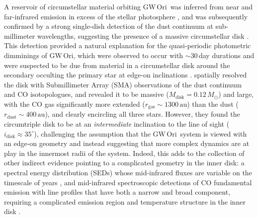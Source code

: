 \documentclass[twocolumn]{aastex61}
\newcommand{\obj}{GW\,Ori}
\begin{document}
A reservoir of circumstellar material orbiting \obj\ was inferred from near and far-infrared emission in excess of the stellar photosphere \citep{mathieu91}, and was subsequently confirmed by a strong single-dish detection of the dust continuum at sub-millimeter wavelengths, suggesting the presence of a massive circumstellar disk \citep[$M_\mathrm{disk} \gtrsim 0.1\,M_\odot$;][]{mathieu95}. This detection provided a natural explanation for the  quasi-periodic photometric dimminings of \obj, which were observed to occur with $\sim$30\,day durations and were suspected to be due from material in a circumstellar disk around the secondary occulting the primary star at edge-on inclinations \citep[requiring orbital inclinations of $i \approx 90^\circ$;][]{shevchenko92,shevchenko98}.
\citet{fang17} spatially resolved the disk with Submillimeter Array (SMA) observations of the dust continuum and CO isotopologues, and revealed it to be massive ($M_\mathrm{disk} = 0.12\,M_\odot$) and large, with the CO gas significantly more extended ($r_\mathrm{gas} \sim 1300\,\mathrm{au}$) than the dust ($r_\mathrm{dust} \sim 400\,\mathrm{au}$), and clearly encircling all three stars. However, they found the circumtriple disk to be at an \emph{intermediate} inclination to the line of sight ($i_\mathrm{disk} \approx 35^\circ$), challenging the assumption that the \obj\ system is viewed with an edge-on geometry and instead suggesting that more complex dynamics are at play in the innermost radii of the system.
Indeed, this adds to the collection of other indirect evidence pointing to a complicated geometry in the inner disk: a spectral energy distribution (SEDs) whose mid-infrared fluxes are variable on the timescale of years \citep{fang14}, and mid-infrared spectroscopic detections of CO fundamental emission with line profiles that have both a narrow and broad component, requiring a complicated emission region and temperature structure in the inner disk \citep{najita03}.
\end{document}
